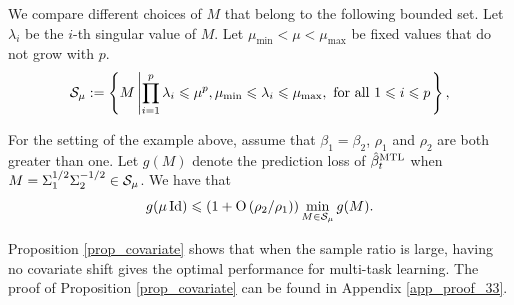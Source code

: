 We compare different choices of $M$ that belong to the following bounded set.
Let $\lambda_i$ be the $i$-th singular value of $M$.
Let $\mu_{\min} < \mu < \mu_{\max}$ be fixed values that do not grow with $p$.
{\begin{align*}
		\mathcal{S}_{\mu}:=\left\{ M \left| \prod_{i=1}^p \lambda_i \leqslant \mu^p, \mu_{\min} \leqslant \lambda_i\leqslant \mu_{\max}, \text{ for all } 1\leqslant i\leqslant p\right. \right\},
\end{align*}}
\begin{proposition}\label{prop_covariate}
	For the setting of the example above, assume that $\beta_1 = \beta_2$, $\rho_1$ and $\rho_2$ are both greater than one.
	Let $g(M)$ denote the prediction loss of $\hat{\beta}_t^{\textup{MTL}}$ when $M = \Sigma_1^{1/2}\Sigma_2^{-1/2} \in\mathcal{S}_{\mu}$.
	We have that
		\[ g(\mu\operatorname{Id}) \leqslant \left({1+ \operatorname{O}\left({\rho_2}/{\rho_1}  \right)}\right) \min_{M\in\mathcal{S}_{\mu}} g(M). \]
\end{proposition}
Proposition \ref{prop_covariate} shows that when the sample ratio is large, having no covariate shift gives the optimal performance for multi-task learning.
The proof of Proposition \ref{prop_covariate} can be found in Appendix \ref{app_proof_33}.






